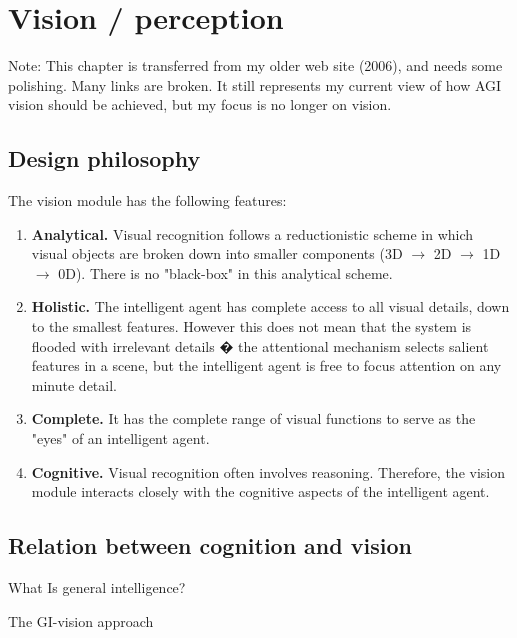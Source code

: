 \chapter{Vision / perception}
\label{ch:vision}
\minitoc

Note:  This chapter is transferred from my older web site (2006), and needs some polishing.  Many links are broken.  It still represents my current view of how AGI vision should be achieved, but my focus is no longer on vision.

\section{Design philosophy}

The vision module has the following features:
\begin{enumerate}[\textbullet ]

\item \textbf{Analytical.} Visual recognition follows a reductionistic scheme in which visual objects are broken down into smaller components (3D $\rightarrow$ 2D $\rightarrow$ 1D $\rightarrow$ 0D). There is no "black-box" in this analytical scheme. 

\item \textbf{Holistic.} The intelligent agent has complete access to all visual details, down to the smallest features. However this does not mean that the system is flooded with irrelevant details � the attentional mechanism selects salient features in a scene, but the intelligent agent is free to focus attention on any minute detail. 

\item \textbf{Complete.} It has the complete range of visual functions to serve as the "eyes" of an intelligent agent. 

\item \textbf{Cognitive.} Visual recognition often involves reasoning. Therefore, the vision module interacts closely with the cognitive aspects of the intelligent agent. 
\end{enumerate}

\section{Relation between cognition and  vision}

\begin{compactenum}
	\item What Is general intelligence?
	\item The GI-vision approach
\end{compactenum}

